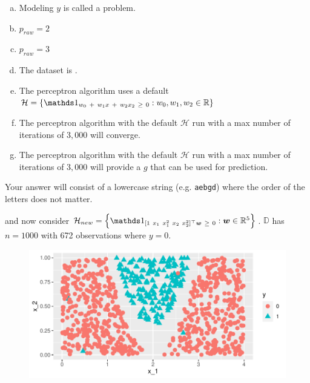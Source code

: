 \documentclass[12pt,landscape]{article}
\newcommand{\instr}{\small Your answer will consist of a lowercase string (e.g. \texttt{aebgd}) where the order of the letters does not matter. \normalsize}
\begin{document}
\begin{enumerate}[(a)]
\item Modeling $y$ is called a  problem.
\item $p_{raw}=2$
\item $p_{raw}=3$
\item The dataset is .
\item The perceptron algorithm uses a default $\mathcal{H} = \braces{\indic{w_0 ~+~ w_1 x ~+~ w_2 x_2~\geq~0}: w_0, w_1, w_2 \in \reals}$
\item The perceptron algorithm with the default $\mathcal{H}$ run with a max number of iterations of $3,000$ will converge.
\item The perceptron algorithm with the default $\mathcal{H}$ run with a max number of iterations of $3,000$ will provide a $g$ that can be used for prediction.
\end{enumerate}
\eenum\instr\pagebreak


\problem{}  and now consider $\mathcal{H}_{new} = \braces{\indic{[1~x_1~x_1^2~x_2~x_2^2]^\top \w~ \geq~ 0}: \w\in \reals^5}$. $\mathbb{D}$ has $n=1000$ with 672 observations where $y=0$. 


\begin{figure}[htp]
\centering
\includegraphics[width = 6in]{binary.pdf}
\end{figure}

\vspace{-0.2cm}\benum{} 
\end{document}
